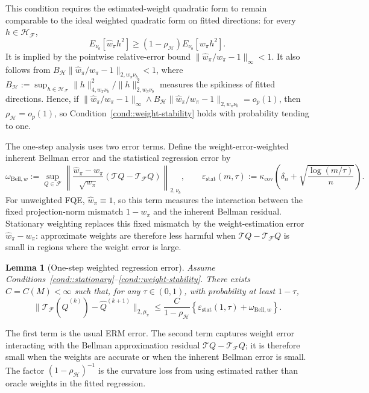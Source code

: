 \documentclass{article}
\theoremstyle{plain}
\newtheorem{lemma}{Lemma}
\theoremstyle{definition}
\theoremstyle{remark}
\begin{document}
This condition requires the estimated-weight quadratic form to remain comparable
to the ideal weighted quadratic form on fitted directions: for every
\(h\in\mathcal H_{\mathcal F}\),
\[
E_{\nu_b}[\widehat w_\pi h^2]
\ge
(1-\rho_{\mathcal H})E_{\nu_b}[w_\pi h^2].
\]
It is implied by the pointwise relative-error bound
\(\|\widehat w_\pi/w_\pi-1\|_\infty<1\). It also follows from
\(B_{\mathcal H}\|\widehat w_\pi/w_\pi-1\|_{2,w_\pi\nu_b}<1\), where
\(B_{\mathcal H}:=\sup_{h\in\mathcal H_{\mathcal F}}
\|h\|_{4,w_\pi\nu_b}^2/\|h\|_{2,w_\pi\nu_b}^2\) measures the spikiness of fitted
directions. Hence, if
\(\|\widehat w_\pi/w_\pi-1\|_\infty \wedge B_{\mathcal H}\|\widehat w_\pi/w_\pi-1\|_{2,w_\pi\nu_b}=o_p(1)\), then
\(\rho_{\mathcal H}=o_p(1)\), so
Condition~\ref{cond::weight-stability} holds with probability tending to one.

The one-step analysis uses two error terms. Define the weight-error-weighted
inherent Bellman error \citep{munos2008finite} and the statistical regression
error by
\[
\omega_{\mathrm{Bell},w}
:=
\sup_{Q\in\mathcal F}
\left\|
\frac{\widehat w_\pi-w_\pi}{\sqrt{w_\pi}}
(\mathcal TQ-\mathcal T_{\mathcal F}Q)
\right\|_{2,\nu_b},
\qquad
\varepsilon_{\mathrm{stat}}(m,\tau)
:=
\kappa_{\mathrm{cov}}
\left(
\delta_n+\sqrt{\frac{\log(m/\tau)}{n}}
\right).
\]
For unweighted FQE, \(\widehat w_\pi\equiv 1\), so this term measures the
interaction between the fixed projection-norm mismatch \(1-w_\pi\) and the
inherent Bellman residual. Stationary weighting replaces this fixed mismatch by
the weight-estimation error \(\widehat w_\pi-w_\pi\): approximate weights are
therefore less harmful when \(\mathcal TQ-\mathcal T_{\mathcal F}Q\) is small
in regions where the weight error is large.

\begin{lemma}[One-step weighted regression error]
\label{lemma::errorperiter}
Assume Conditions~\ref{cond::stationary}--\ref{cond::weight-stability}. There
exists \(C=C(M)<\infty\) such that, for any \(\tau\in(0,1)\), with
probability at least \(1-\tau\),
\[
\|\mathcal T_{\mathcal F}(\widehat Q^{(k)})-\widehat Q^{(k+1)}\|_{2,\mu_\pi}
\le
\frac{C}{1-\rho_{\mathcal H}}
\left\{
\varepsilon_{\mathrm{stat}}(1,\tau)
+\omega_{\mathrm{Bell},w}
\right\}.
\]
\end{lemma}

The first term is the usual ERM error. The second term captures weight error
interacting with the Bellman approximation residual
\(\mathcal TQ-\mathcal T_{\mathcal F}Q\); it is therefore small when the weights
are accurate or when the inherent Bellman error is small. The factor
\((1-\rho_{\mathcal H})^{-1}\) is the curvature loss from using estimated rather
than oracle weights in the fitted regression.
\end{document}
